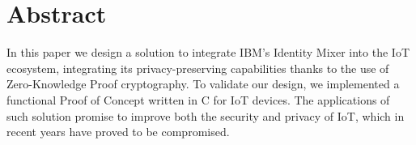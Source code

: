 \begingroup
\let\clearpage\relax
\let\cleardoublepage\relax
\let\cleardoublepage\relax

\chapter*{Abstract}

In this paper we design a solution to integrate IBM's Identity Mixer into the IoT ecosystem, integrating its privacy-preserving capabilities thanks to the use of Zero-Knowledge Proof cryptography. To validate our design, we implemented a functional Proof of Concept written in C for IoT devices. The applications of such solution promise to improve both the security and privacy of IoT, which in recent years have proved to be compromised.


\vfill


\endgroup			

\vfill